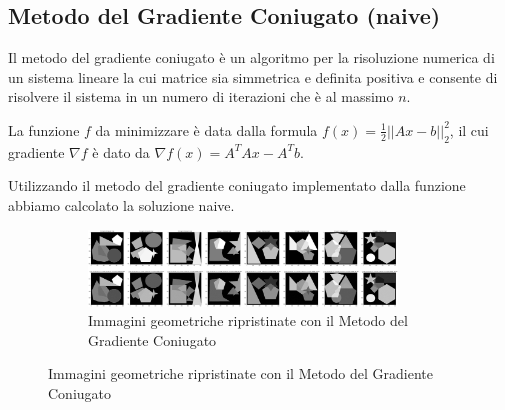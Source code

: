 \subsection{Metodo del Gradiente Coniugato (naive)}
Il metodo del gradiente coniugato è un algoritmo per la risoluzione numerica di un sistema lineare la cui matrice sia simmetrica e definita positiva
 e consente di risolvere il sistema in un numero di iterazioni che è al massimo $n$.

La funzione $f$ da minimizzare è data dalla formula
  $f(x) = \frac{1}{2} ||Ax - b||_2^2 $, il cui gradiente $\nabla f$ è dato da
$\nabla f(x) = A^TAx - A^Tb  $.

Utilizzando il metodo del gradiente coniugato implementato dalla funzione 
 abbiamo calcolato la soluzione naive.

\begin{figure}[H]
  \centering
  \begin{subfigure}{0.9\textwidth}
    \centering
    \includegraphics[width=0.9\textwidth]{imgRel/datasetconiugato.png}
    \caption{Immagini geometriche ripristinate con il Metodo del Gradiente Coniugato}
    \label{fig:geomripristinate}
  \end{subfigure}


\end{figure}
